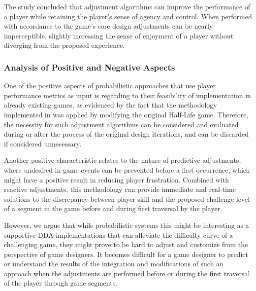 The study concluded that adjustment algorithms can improve the performance of a player while retaining the player's sense of agency and control. When performed with accordance to the game's core design adjustments can be nearly imperceptible, slightly increasing the sense of enjoyment of a player without diverging from the proposed experience.

\subsubsection{Analysis of Positive and Negative Aspects}

One of the positive aspects of probabilistic approaches that use player performance metrics as input is regarding to their feasibility of implementation in already existing games, as evidenced by the fact that the methodology implemented in \citet{article_casefordynamicdifficulty} was applied by modifying the original Half-Life game. Therefore, the necessity for such adjustment algorithms can be considered and evaluated during or after the process of the original design iterations, and can be discarded if considered unnecessary.

Another positive characteristic relates to the nature of predictive adjustments, where undesired in-game events can be prevented before a first occurrence, which might have a positive result in reducing player frustration. Combined with reactive adjustments, this methodology can provide immediate and real-time solutions to the discrepancy between player skill and the proposed challenge level of a segment in the game before and during first traversal by the player.


However, we argue that while probabilistic systems this might be  interesting as a supportive DDA implementations that can alleviate the difficulty curve of a challenging game, they might prove to be hard to adjust and customize from the perspective of game designers. It becomes difficult for a game designer to predict or understand the results of the integration and modifications of such an approach when the adjustments are performed before or during the first traversal of the player through game segments.


